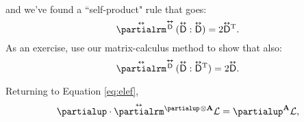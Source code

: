 \documentclass[12pt]{article}
\renewcommand{\vv}[1]{\mathbf{#1}}
\newcommand{\superoverset}[2]{%
  \mathop{#2}\limits^{\vbox to -.5ex{\kern-0.95ex\hbox{$#1$}\vss}}}
\newcommand{\superdy}[1]{\superoverset{\text{\tiny$\bm\leftrightarrow$}}{#1}}
\newcommand{\capdy}[1]{ \overset{ \text{\tiny$\bm\leftrightarrow$} }{\vphantom{\text{\small{A}}}\smash{#1}} }
\begin{document}
and we've found a ``self-product" rule that goes:
\begin{equation}\label{eq:dyoprule1}
\capdy{\partialrm} {}^{\superdy{\mathsf{D}}} \, ( \capdy{\mathsf{D}} : \capdy{\mathsf{D}} ) = 2 \capdy{\mathsf{D}} {}^\mathrm{T} .
\end{equation}
As an exercise, use our matrix-calculus method to show that also:
 \begin{equation}\label{eq:dyoprule2}
\capdy{\partialrm} {}^{\superdy{\mathsf{D}}} \, ( \capdy{\mathsf{D}} : \capdy{\mathsf{D}} {}^\mathrm{T} ) = 2 \capdy{\mathsf{D}} .
\end{equation}

Returning to Equation \ref{eq:elef},
\begin{equation*}
\partialup \cdot \capdy{\partialrm} {}^{\partialup \mkern2mu \otimes \vv A} \mathcal{L} = \partialup^{\vv A} \mathcal{L},
\end{equation*}
\end{document}
